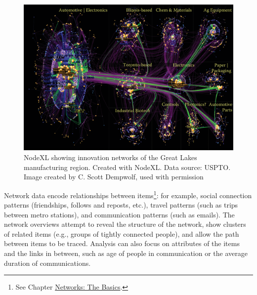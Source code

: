 \documentclass[]{krantz}
\begin{document}
\begin{figure}

{\centering \includegraphics[width=0.9\linewidth]{ChapterViz/figures/fig9-10} 

}

\caption{NodeXL showing innovation networks of the Great Lakes manufacturing region. Created with NodeXL. Data source: USPTO. Image created by C. Scott Dempwolf, used with permission}\label{fig:fig9-10}
\end{figure}

Network data encode relationships between items\footnote{See Chapter
  \protect\hyperlink{chap:networks}{Networks: The Basics}.}: for
example, social connection patterns (friendships, follows and reposts,
etc.), travel patterns (such as trips between metro stations), and
communication patterns (such as emails). The network overviews attempt
to reveal the structure of the network, show clusters of related items
(e.g., groups of tightly connected people), and allow the path between
items to be traced. Analysis can also focus on attributes of the items
and the links in between, such as age of people in communication or the
average duration of communications.
\end{document}
